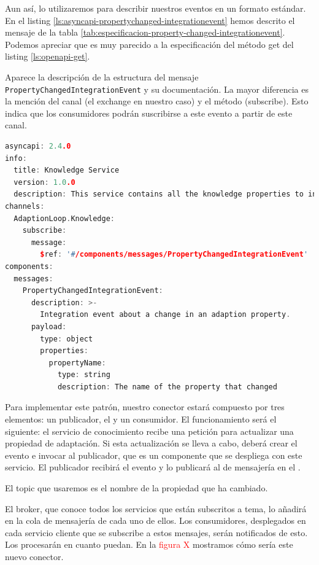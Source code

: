 Aun así, lo utilizaremos para describir nuestros eventos en un formato estándar. En el listing \ref{ls:asyncapi-propertychanged-integrationevent} hemos descrito el mensaje de la tabla \ref{tab:especificacion-property-changed-integrationevent}. Podemos apreciar que es muy parecido a la especificación del método get del listing \ref{ls:openapi-get}.

Aparece la descripción de la estructura del mensaje \texttt{PropertyChangedIntegrationEvent} y su documentación. La mayor diferencia es la mención del canal (el exchange en nuestro caso) y el método (subscribe). Esto indica que los consumidores podrán suscribirse a este evento a partir de este canal.

\begin{lstlisting}[language={C++},caption={Ejemplo del evento de integración \emph{builder}.},captionpos=b, label=ls:asyncapi-propertychanged-integrationevent]
asyncapi: 2.4.0
info:
  title: Knowledge Service
  version: 1.0.0
  description: This service contains all the knowledge properties to inform the rest of the loop.
channels:
  AdaptionLoop.Knowledge:
    subscribe:
      message:
        $ref: '#/components/messages/PropertyChangedIntegrationEvent'
components:
  messages:
    PropertyChangedIntegrationEvent:
      description: >-
        Integration event about a change in an adaption property.
      payload:
        type: object
        properties:
          propertyName:
            type: string
            description: The name of the property that changed
\end{lstlisting}

Para implementar este patrón, nuestro conector estará compuesto por tres elementos: un publicador, el  y un consumidor. El funcionamiento será el siguiente: el servicio de conocimiento recibe una petición para actualizar una propiedad de adaptación. Si esta actualización se lleva a cabo, deberá crear el evento e invocar al publicador, que es un componente que se despliega con este servicio. El publicador recibirá el evento y lo publicará al  de mensajería en el .

El topic que usaremos es el nombre de la propiedad que ha cambiado.

El broker, que conoce todos los servicios que están subscritos a tema, lo añadirá en la cola de mensajería de cada uno de ellos. Los consumidores, desplegados en cada servicio cliente que se subscribe a estos mensajes, serán notificados de esto. Los procesarán en cuanto puedan. En la \textcolor{red}{figura X} mostramos cómo sería este nuevo conector.

